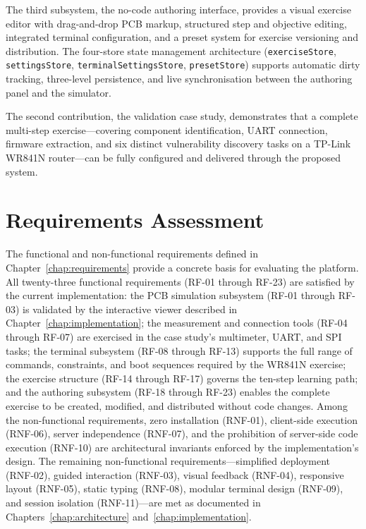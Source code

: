 The third subsystem, the no-code authoring interface, provides a visual exercise editor with drag-and-drop PCB markup, structured step and objective editing, integrated terminal configuration, and a preset system for exercise versioning and distribution. The four-store state management architecture (\texttt{exerciseStore}, \texttt{settingsStore}, \texttt{terminalSettingsStore}, \texttt{presetStore}) supports automatic dirty tracking, three-level persistence, and live synchronisation between the authoring panel and the simulator.

The second contribution, the validation case study, demonstrates that a complete multi-step exercise---covering component identification, UART connection, firmware extraction, and six distinct vulnerability discovery tasks on a TP-Link WR841N router---can be fully configured and delivered through the proposed system.

\section{Requirements Assessment}\label{sec:req-assessment}

The functional and non-functional requirements defined in Chapter~\ref{chap:requirements} provide a concrete basis for evaluating the platform. All twenty-three functional requirements (RF-01 through RF-23) are satisfied by the current implementation: the PCB simulation subsystem (RF-01 through RF-03) is validated by the interactive viewer described in Chapter~\ref{chap:implementation}; the measurement and connection tools (RF-04 through RF-07) are exercised in the case study's multimeter, UART, and SPI tasks; the terminal subsystem (RF-08 through RF-13) supports the full range of commands, constraints, and boot sequences required by the WR841N exercise; the exercise structure (RF-14 through RF-17) governs the ten-step learning path; and the authoring subsystem (RF-18 through RF-23) enables the complete exercise to be created, modified, and distributed without code changes. Among the non-functional requirements, zero installation (RNF-01), client-side execution (RNF-06), server independence (RNF-07), and the prohibition of server-side code execution (RNF-10) are architectural invariants enforced by the implementation's design. The remaining non-functional requirements---simplified deployment (RNF-02), guided interaction (RNF-03), visual feedback (RNF-04), responsive layout (RNF-05), static typing (RNF-08), modular terminal design (RNF-09), and session isolation (RNF-11)---are met as documented in Chapters~\ref{chap:architecture} and~\ref{chap:implementation}.

